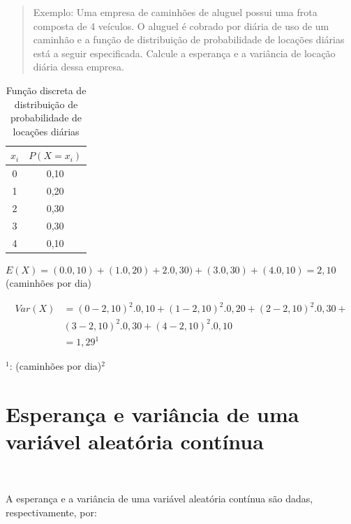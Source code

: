 \documentclass[
]{book}
\begin{document}
\hfill\break

\begin{quote}
Exemplo: Uma empresa de caminhões de aluguel possui uma frota composta de 4 veículos. O aluguel é cobrado por diária de uso de um caminhão e a função de distribuição de probabilidade de locações diárias está a seguir especificada. Calcule a esperança e a variância de locação diária dessa empresa.
\end{quote}

\hfill\break

\begin{table}[htbp]
\centering
\caption*{Função discreta de distribuição de probabilidade de locações diárias}
\begin{tabular}{|c|c|}
\hline
$x_{i}$  & $P(X=x_{i})$  \\
\hline
0 & 0,10 \\
\hline
1 & 0,20 \\
\hline
2 & 0,30 \\
\hline
3 & 0,30 \\
\hline
4 & 0,10 \\
\hline
\end{tabular}
\end{table}

\hfill\break

\(E(X) = (0 . 0,10) + (1 . 0,20) + 2 . 0,30) + (3 . 0,30) + (4 . 0,10) = 2,10\) (caminhões por dia)

\hfill\break

\begin{align*}
Var(X) & = (0-2,10)^{2}.0,10 + (1-2,10)^{2}.0,20 + (2-2,10)^{2}.0,30 + \\
       & (3-2,10)^{2}.0,30 + (4-2,10)^{2}.0,10 \\
       & = 1,29^{1}
\end{align*}

\(^{1}\): (caminhões por dia)\(^{2}\)

\hypertarget{esperanuxe7a-e-variuxe2ncia-de-uma-variuxe1vel-aleatuxf3ria-contuxednua}{%
\section{Esperança e variância de uma variável aleatória contínua}\label{esperanuxe7a-e-variuxe2ncia-de-uma-variuxe1vel-aleatuxf3ria-contuxednua}}

~

A esperança e a variância de uma variável aleatória contínua são dadas, respectivamente, por:
\end{document}
